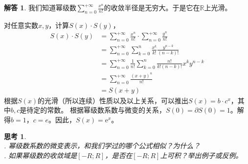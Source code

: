 \documentclass[12pt,UTF8]{ctexbook}
\theoremstyle{definition}
\newtheorem*{so}{解答}
\theoremstyle{plain}
\newtheorem{sk}{思考}[section]
\begin{document}
\begin{so}
    我们知道幂级数$\sum_{n=0}^{+\infty} \frac{x^n}{n!}$的收敛半径是无穷大。于是它在$\mathbb{R}$上光滑。

    对任意实数$x,y$，计算$S(x)\cdot S(y)$，
    \begin{align*}
        S(x)\cdot S(y) &= \sum_{n=0}^{+\infty} \frac{x^n}{n!} \cdot \sum_{n=0}^{+\infty} \frac{y^n}{n!} \\
        &= \sum_{n=0}^{+\infty} \sum_{k=0}^{n} \frac{x^k}{k!} \frac{y^{n-k}}{(n-k)!} \\
        &= \sum_{n=0}^{+\infty} \frac{1}{n!} \sum_{k=0}^{n} \frac{n!}{k!(n-k)!} x^ky^{n-k} \\
        &= \sum_{n=0}^{+\infty} \frac{(x + y)^n}{n!} \\
        &= S(x + y)
    \end{align*}
    根据$S(x)$的光滑（所以连续）性质以及以上关系，可以推出$S(x) = b\cdot c^x$，其中$b,c$是待定的常数。
    根据幂级数系数与微变的关系，$S(0) = \partial S(0) = 1$。解得$b=1$，$c=e$。因此，$S(x) = \mathrm{e}^x$。
\end{so}


\begin{sk}
    \mbox{} \\
    . 幂级数系数的微变表示，和我们学过的哪个公式相似？为什么？\\
    . 如果幂级数的收敛域是$[-R;R]$，是否在$[-R;R]$上可积？举出例子或反例。
\end{sk}
\end{document}
